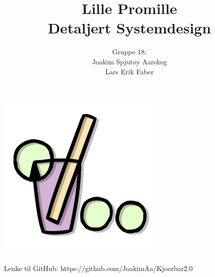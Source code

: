 \documentclass[12pt]{article}
\begin{document}
\title{%
    Lille Promille\\
    \large Detaljert Systemdesign}
\author{
    Gruppe 18:\\
    Joakim Spjutøy Aarskog\\
    Lars Erik Faber}
\date{}
\maketitle
\begin{center}
    \includegraphics[scale=3]{images/lille_promille_logo.png}    
\end{center}
\thispagestyle{empty}
\newpage
\tableofcontents
\thispagestyle{empty}
\newpage
\setcounter{page}{1}

Lenke til GitHub: https://github.com/JoakimAa/Kjoerbar2.0






\end{document}
